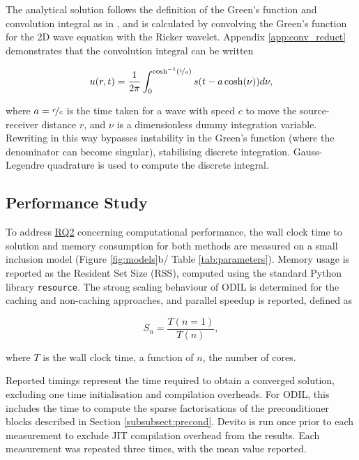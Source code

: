 \documentclass[final-report]{report-template}
\begin{document}
The analytical solution follows the definition of the Green's function and convolution integral as in \cite{wapenaarMultipleReflectionsHuygens2025}, and is calculated by convolving the Green's function for the 2D wave equation with the Ricker wavelet. Appendix \ref{app:conv_reduct} demonstrates that the convolution integral can be written

\begin{equation}
    u(r, t) = \frac{1}{2\pi} \int^{\cosh^{-1}(\nicefrac{t}{a})}_{0}s(t - a\cosh(\nu)) d\nu,
    \label{eq:reduced_conv}
\end{equation}

where $a = \nicefrac{r}{c}$ is the time taken for a wave with speed $c$ to move the source-receiver distance $r$, and $\nu$ is a dimensionless dummy integration variable. Rewriting in this way bypasses instability in the Green's function (where the denominator can become singular), stabilising discrete integration. Gauss-Legendre quadrature is used to compute the discrete integral.

\subsection{Performance Study}
\label{subsect:perf}
To address \hyperref[rq:2]{RQ2} concerning computational performance, the wall clock time to solution and memory consumption for both methods are measured on a small inclusion model (Figure \ref{fig:models}b/ Table \ref{tab:parameters}). Memory usage is reported as the Resident Set Size (RSS), computed using the standard Python library \texttt{resource}. The strong scaling behaviour of ODIL is determined for the caching and non-caching approaches, and parallel speedup is reported, defined as

\begin{equation}
    S_n = \frac{T(n=1)}{T(n)},
\end{equation}

where $T$ is the wall clock time, a function of $n$, the number of cores.

\newpage
Reported timings represent the time required to obtain a converged solution, excluding one time initialisation and compilation overheads. For ODIL, this includes the time to compute the sparse factorisations of the preconditioner blocks described in Section \ref{subsubsect:precond}. Devito is run once prior to each measurement to exclude JIT compilation overhead from the results. Each measurement was repeated three times, with the mean value reported.
\end{document}
